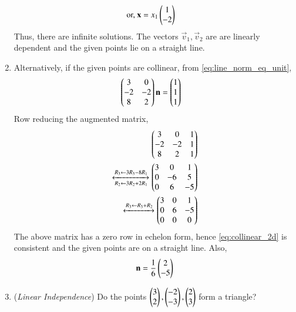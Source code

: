 \begin{enumerate}[label=\thesection.\arabic*.,ref=\thesection.\theenumi]
\begin{align}
\\
\text{or, } \mathbf{x} &= x_1\begin{pmatrix}1\\-2\end{pmatrix}
\end{align}
Thus, there are infinite solutions.  The vectors $\vec{v}_1, \vec{v}_2$ are are linearly dependent and the given points  lie on a straight line.
\item Alternatively, if the given points are collinear, from \eqref{eq:line_norm_eq_unit},
\begin{align}
\label{eq:collinear_2d}
\begin{pmatrix}3&0 \\ -2&-2 \\ 8&2\end{pmatrix} \mathbf{n} &= \begin{pmatrix}1\\1\\1\end{pmatrix}
\end{align}
Row reducing the augmented matrix,
\begin{align}
\begin{pmatrix}3&0 & 1\\ -2&-2 & 1\\ 8&2 & 1\end{pmatrix} 
\\
\xleftrightarrow[R_2\leftarrow 3R_2+2R_1]{R_3\leftarrow 3R_3-8R_1}
\begin{pmatrix}3&0 & 1\\ 0&-6 & 5\\ 0&6 & -5\end{pmatrix}
\\
 \xleftrightarrow[]{R_3\leftarrow R_3+R_2}\begin{pmatrix}3&0 & 1\\ 0&6 & -5\\ 0&0 & 0\end{pmatrix}
\end{align}
The above matrix has a zero row in echelon form, hence \eqref{eq:collinear_2d}
is consistent and the given points are on a straight line. Also,
\begin{align}
\mathbf{n} = \frac{1}{6}\begin{pmatrix}2\\-5\end{pmatrix}
\end{align}
\item ({\em Linear Independence}) Do the points $\begin{pmatrix}3\\2\end{pmatrix},\begin{pmatrix}-2\\-3\end{pmatrix},\begin{pmatrix}2\\3\end{pmatrix}$ form a triangle?
\label{prob:points_triangle}
\begin{figure}
\centering

\end{figure}
\end{enumerate}
